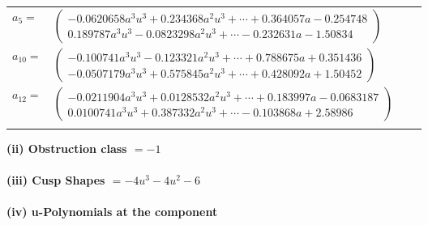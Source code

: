 \documentclass[1p]{elsarticle_modified}
\theoremstyle{definition}
\begin{document}
\begin{tabular}{m{7pt} m{180pt} m{7pt} m{180pt} }
\flushright $a_{5}=$&$\begin{pmatrix}-0.0620658 a^{3} u^{3}+0.234368 a^{2} u^{3}+\cdots+0.364057 a-0.254748\\0.189787 a^{3} u^{3}-0.0823298 a^{2} u^{3}+\cdots-0.232631 a-1.50834\end{pmatrix}$ \\
\flushright $a_{10}=$&$\begin{pmatrix}-0.100741 a^{3} u^{3}-0.123321 a^{2} u^{3}+\cdots+0.788675 a+0.351436\\-0.0507179 a^{3} u^{3}+0.575845 a^{2} u^{3}+\cdots+0.428092 a+1.50452\end{pmatrix}$ \\
\flushright $a_{12}=$&$\begin{pmatrix}-0.0211904 a^{3} u^{3}+0.0128532 a^{2} u^{3}+\cdots+0.183997 a-0.0683187\\0.0100741 a^{3} u^{3}+0.387332 a^{2} u^{3}+\cdots-0.103868 a+2.58986\end{pmatrix}$\\&\end{tabular}
\flushleft \textbf{(ii) Obstruction class $= -1$}\\~\\
\flushleft \textbf{(iii) Cusp Shapes $= -4 u^3-4 u^2-6$}\\~\\
\newpage\renewcommand{\arraystretch}{1}
\flushleft \textbf{(iv) u-Polynomials at the component}\newline \\
\end{document}
